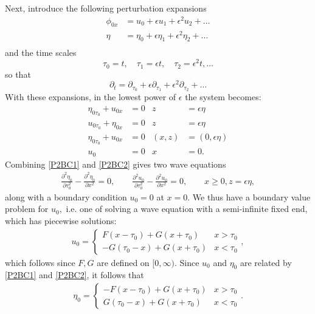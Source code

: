 \documentclass[10pt,reqno,oneside,a4paper]{article}
\begin{document}
Next, introduce the following perturbation expansions
\begin{align*}
\phi_{0x} &= u_0 + \epsilon u_1 +  \epsilon^2 u_2 + \ldots \\
\eta &= \eta_0 + \epsilon \eta_1 +  \epsilon^2 \eta_2 + \ldots \\
\end{align*}
and the time scales
\[ 
\tau_0 = t, \quad \tau_1 = \epsilon t, \quad \tau_2 = \epsilon^2 t, \ldots
\]
so that 
\[ 
\partial_t = \partial_{\tau_0} + \epsilon \partial_{\tau_1} + \epsilon^2 \partial_{\tau_2} + \ldots
\]
With these expansions, in the lowest power of $\epsilon$ the system becomes:
\begin{subequations} \label{NonDimHalfLineProb2}
\begin{align}
\label{P2BC1}\eta_{0\tau_0} + u_{0x} &=0 &z &= \epsilon\eta \\
\label{P2BC2} u_{0\tau_0} + \eta_{0x} &= 0 &z &= \epsilon\eta  \\
\label{P2BC3}\eta_{0\tau_0} +  u_{0x} &=0 &(x,z) &= (0,\epsilon\eta) \\
\label{P2BC4} u_0 &= 0 &x &= 0.
\end{align}
\end{subequations}
Combining \eqref{P2BC1} and \eqref{P2BC2} gives two wave equations
\begin{align*}
\frac{\partial^2 \eta_0}{\partial \tau_0^2} - \frac{\partial^2 \eta_0}{\partial x^2} = 0, \qquad \frac{\partial^2 u_0}{\partial \tau_0^2} - \frac{\partial^2 u_0}{\partial x^2} = 0, \qquad x\geq0, z= \epsilon \eta,
\end{align*}
along with a boundary condition $u_0 = 0$ at $x=0.$ We thus have a boundary value problem for $u_0,$ i.e. one of solving a wave equation with a semi-infinite fixed end, which has piecewise solutions:
\begin{align*}
u_0 = \begin{cases} F(x - \tau_0) + G(x+\tau_0) & x>\tau_0 \\ -G(\tau_0 - x) + G(x+\tau_0) & x< \tau_0 \end{cases},
\end{align*}
which follows since $F,G$ are defined on $[0, \infty).$ Since $u_0$ and $\eta_0$ are related by \eqref{P2BC1} and \eqref{P2BC2}, it follows that
\begin{align*}
\eta_0 = \begin{cases} - F(x - \tau_0) + G(x+\tau_0) & x>\tau_0 \\ G(\tau_0 - x) + G(x+\tau_0) & x< \tau_0 \end{cases}.
\end{align*}
\end{document}
